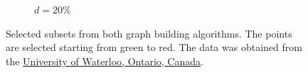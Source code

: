 \begin{figure}[!h]
\begin{subfigure}[b]{0.24\linewidth}
  	\caption{\small $d=20\%$} 
  	\label{fig:20_sweden} 
  	\vspace{4ex}
  \end{subfigure}
  \caption[Selected subsets from both graph building algorithms]{Selected subsets from both graph building algorithms. The points are selected starting from green to red. The data was obtained from the \href{http://www.math.uwaterloo.ca/tsp/world/swpoints.html}{University of Waterloo, Ontario, Canada}\cite{waterloo_sweden}.}
  \label{fig:sweden_dist} 
\end{figure}

